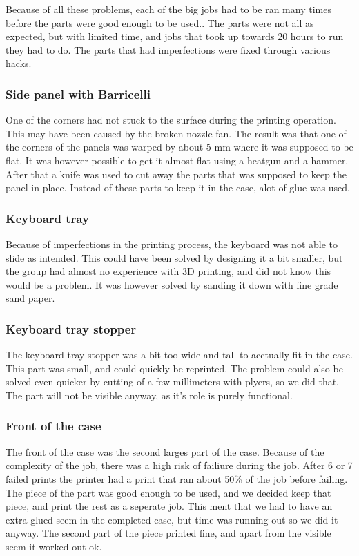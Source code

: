 Because of all these problems, each of the big jobs had to be ran many times before the parts were good enough to be used..
The parts were not all as expected, but with limited time, and jobs that took up towards 20 hours to run they had to do.
The parts that had imperfections were fixed through various hacks.

\subsubsection*{Side panel with Barricelli}
One of the corners had not stuck to the surface during the printing operation.
This may have been caused by the broken nozzle fan.
The result was that one of the corners of the panels was warped by about 5 mm where it was supposed to be flat.
It was however possible to get it almost flat using a heatgun and a hammer.
After that a knife was used to cut away the parts that was supposed to keep the panel in place.
Instead of these parts to keep it in the case, alot of glue was used.

\subsubsection*{Keyboard tray}
Because of imperfections in the printing process, the keyboard was not able to slide as intended.
This could have been solved by designing it a bit smaller, but the group had almost no experience with 3D printing, and did not know this would be a problem.
It was however solved by sanding it down with fine grade sand paper.

\subsubsection*{Keyboard tray stopper}
The keyboard tray stopper was a bit too wide and tall to acctually fit in the case.
This part was small, and could quickly be reprinted.
The problem could also be solved even quicker by cutting of a few millimeters with plyers, so we did that.
The part will not be visible anyway, as it's role is purely functional.

\subsubsection*{Front of the case}
The front of the case was the second larges part of the case.
Because of the complexity of the job, there was a high risk of failiure during the job.
After 6 or 7 failed prints the printer had a print that ran about 50\% of the job before failing.
The piece of the part was good enough to be used, and we decided keep that piece, and print the rest as a seperate job.
This ment that we had to have an extra glued seem in the completed case, but time was running out so we did it anyway.
The second part of the piece printed fine, and apart from the visible seem it worked out ok.

